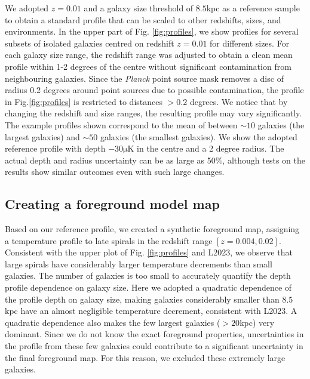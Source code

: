\documentclass{aa}
\begin{document}
We adopted $z=0.01$ and a galaxy size threshold of $8.5$\;kpc as a reference sample to obtain a standard profile that can be scaled to other redshifts, sizes, and environments. In the upper part of Fig. \ref{fig:profiles}, we show profiles for several subsets of isolated galaxies centred on redshift $z=0.01$ for different sizes. For each galaxy size range, the redshift range was adjusted to obtain a clean mean profile within 1-2 degrees of the centre without significant contamination from neighbouring galaxies. Since the \textit{Planck} point source mask removes a disc of radius 0.2 degrees around point sources due to possible contamination, the profile in Fig.\ref{fig:profiles} is restricted to distances $>0.2$ degrees. We notice that by changing the redshift and size ranges, the resulting profile may vary significantly. The example profiles shown correspond to the mean of between $\sim 10$ galaxies (the largest galaxies) and $\sim 50$ galaxies (the smallest galaxies).  We show the adopted reference profile with depth $-30\mathrm{\mu K}$ in the centre and a 2 degree radius. The actual depth and radius uncertainty can be as large as 50\%, although tests on the results show similar outcomes even with such large changes.


\subsection{Creating a foreground model map}

Based on our reference profile, we created a synthetic foreground map, assigning a temperature profile to late spirals in the redshift range $[z=0.004, 0.02]$. Consistent with the upper plot of Fig. \ref{fig:profiles} and L2023, we observe that large spirals have considerably larger temperature decrements than small galaxies. The number of galaxies is too small to accurately quantify the depth profile dependence on galaxy size. Here we adopted a quadratic dependence of the profile depth on galaxy size, making galaxies considerably smaller than $8.5$\;kpc have an almost negligible temperature decrement, consistent with L2023. A quadratic dependence also makes the few largest galaxies ($>20$\;kpc) very dominant. Since we do not know the exact foreground properties, uncertainties in the profile from these few galaxies could contribute to a significant uncertainty in the final foreground map. For this reason, we excluded these extremely large galaxies.
\end{document}
